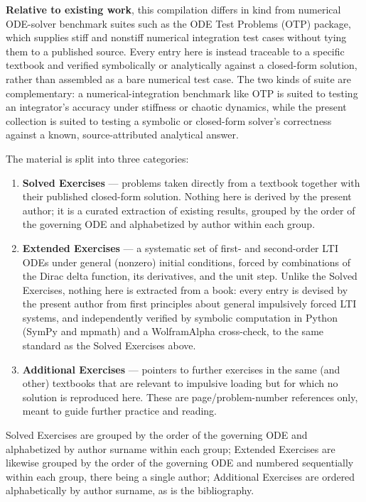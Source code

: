 \documentclass[
  11pt,
]{article}
\providecommand{\tightlist}{%
  \setlength{\itemsep}{0pt}\setlength{\parskip}{0pt}}
\begin{document}
\textbf{Relative to existing work}, this compilation differs in kind
from numerical ODE-solver benchmark suites such as the ODE Test Problems
(OTP) package, which supplies stiff and nonstiff numerical integration
test cases without tying them to a published source. Every entry here is
instead traceable to a specific textbook and verified symbolically or
analytically against a closed-form solution, rather than assembled as a
bare numerical test case. The two kinds of suite are complementary: a
numerical-integration benchmark like OTP is suited to testing an
integrator's accuracy under stiffness or chaotic dynamics, while the
present collection is suited to testing a symbolic or closed-form
solver's correctness against a known, source-attributed analytical
answer.

The material is split into three categories:

\begin{enumerate}
\def\labelenumi{\arabic{enumi}.}
\tightlist
\item
  \textbf{Solved Exercises} --- problems taken directly from a textbook
  together with their published closed-form solution. Nothing here is
  derived by the present author; it is a curated extraction of existing
  results, grouped by the order of the governing ODE and alphabetized by
  author within each group.
\item
  \textbf{Extended Exercises} --- a systematic set of first- and
  second-order LTI ODEs under general (nonzero) initial conditions,
  forced by combinations of the Dirac delta function, its derivatives,
  and the unit step. Unlike the Solved Exercises, nothing here is
  extracted from a book: every entry is devised by the present author
  from first principles about general impulsively forced LTI systems,
  and independently verified by symbolic computation in Python (SymPy
  and mpmath) and a WolframAlpha cross-check, to the same standard as
  the Solved Exercises above.
\item
  \textbf{Additional Exercises} --- pointers to further exercises in the
  same (and other) textbooks that are relevant to impulsive loading but
  for which no solution is reproduced here. These are
  page/problem-number references only, meant to guide further practice
  and reading.
\end{enumerate}

Solved Exercises are grouped by the order of the governing ODE and
alphabetized by author surname within each group; Extended Exercises are
likewise grouped by the order of the governing ODE and numbered
sequentially within each group, there being a single author; Additional
Exercises are ordered alphabetically by author surname, as is the
bibliography.
\end{document}
